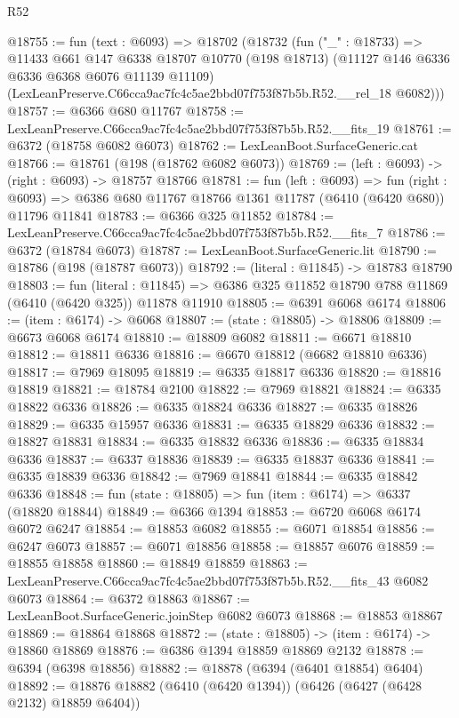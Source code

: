 \begin{lexlean}{R52}
\begin{coremodule}
@18755 := fun (text : @6093) =>
  @18702
    (@18732
      (fun ("_" : @18733) =>
      @11433
        @661
        @147
        @6338
        @18707
        @10770
        (@198 @18713)
        (@11127 @146 @6336 @6336 @6368 @6076 @11139 @11109)
        (LexLeanPreserve.C66cca9ac7fc4c5ae2bbd07f753f87b5b.R52.__rel_18 @6082)))
@18757 := @6366 @680 @11767
@18758 := LexLeanPreserve.C66cca9ac7fc4c5ae2bbd07f753f87b5b.R52.__fits_19
@18761 := @6372 (@18758 @6082 @6073)
@18762 := LexLeanBoot.SurfaceGeneric.cat
@18766 := @18761 (@198 (@18762 @6082 @6073))
@18769 := (left : @6093) -> (right : @6093) -> @18757 @18766
@18781 := fun (left : @6093) =>
  fun (right : @6093) => @6386 @680 @11767 @18766 @1361 @11787 (@6410 (@6420 @680)) @11796 @11841
@18783 := @6366 @325 @11852
@18784 := LexLeanPreserve.C66cca9ac7fc4c5ae2bbd07f753f87b5b.R52.__fits_7
@18786 := @6372 (@18784 @6073)
@18787 := LexLeanBoot.SurfaceGeneric.lit
@18790 := @18786 (@198 (@18787 @6073))
@18792 := (literal : @11845) -> @18783 @18790
@18803 := fun (literal : @11845) =>
  @6386 @325 @11852 @18790 @788 @11869 (@6410 (@6420 @325)) @11878 @11910
@18805 := @6391 @6068 @6174
@18806 := (item : @6174) -> @6068
@18807 := (state : @18805) -> @18806
@18809 := @6673 @6068 @6174
@18810 := @18809 @6082
@18811 := @6671 @18810
@18812 := @18811 @6336
@18816 := @6670 @18812 (@6682 @18810 @6336)
@18817 := @7969 @18095
@18819 := @6335 @18817 @6336
@18820 := @18816 @18819
@18821 := @18784 @2100
@18822 := @7969 @18821
@18824 := @6335 @18822 @6336
@18826 := @6335 @18824 @6336
@18827 := @6335 @18826
@18829 := @6335 @15957 @6336
@18831 := @6335 @18829 @6336
@18832 := @18827 @18831
@18834 := @6335 @18832 @6336
@18836 := @6335 @18834 @6336
@18837 := @6337 @18836
@18839 := @6335 @18837 @6336
@18841 := @6335 @18839 @6336
@18842 := @7969 @18841
@18844 := @6335 @18842 @6336
@18848 := fun (state : @18805) => fun (item : @6174) => @6337 (@18820 @18844)
@18849 := @6366 @1394
@18853 := @6720 @6068 @6174 @6072 @6247
@18854 := @18853 @6082
@18855 := @6071 @18854
@18856 := @6247 @6073
@18857 := @6071 @18856
@18858 := @18857 @6076
@18859 := @18855 @18858
@18860 := @18849 @18859
@18863 := LexLeanPreserve.C66cca9ac7fc4c5ae2bbd07f753f87b5b.R52.__fits_43 @6082 @6073
@18864 := @6372 @18863
@18867 := LexLeanBoot.SurfaceGeneric.joinStep @6082 @6073
@18868 := @18853 @18867
@18869 := @18864 @18868
@18872 := (state : @18805) -> (item : @6174) -> @18860 @18869
@18876 := @6386 @1394 @18859 @18869 @2132
@18878 := @6394 (@6398 @18856)
@18882 := @18878 (@6394 (@6401 @18854) @6404)
@18892 := @18876 @18882 (@6410 (@6420 @1394)) (@6426 (@6427 (@6428 @2132) @18859 @6404))

\end{coremodule}
\end{lexlean}
